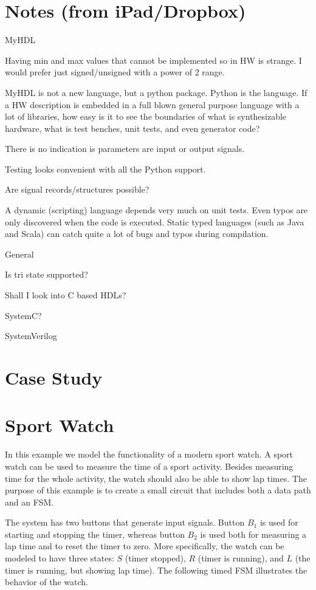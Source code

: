 \documentclass[10pt, technote, draftcls, onecolumn]{IEEEtran}
\begin{document}
\section{Notes (from iPad/Dropbox)}

MyHDL

Having min and max values that cannot be implemented so in HW is strange. I would prefer just signed/unsigned with a power of 2 range.

MyHDL is not a new language, but a python package. Python is the language. If a HW description is embedded in a full blown general purpose language with a lot of libraries, how easy is it to see the boundaries of what is synthesizable hardware, what is test benches, unit tests, and even generator code?

There is no indication is parameters are input or output signals.

Testing looks convenient with all the Python support.

Are signal records/structures possible?

A dynamic (scripting) language depends very much on unit tests. Even typos are only
discovered when the code is executed. Static typed languages (such as Java
and Scala) can catch quite a lot of bugs and typos during compilation.

General

Is tri state supported?

Shall I look into C based HDLs?

SystemC?

SystemVerilog

\section{Case Study}

\section{Sport Watch}
In this example we model the functionality of a modern sport
watch. A sport watch can be used to 
measure the time of a sport activity. Besides measuring time for the
whole activity, the watch should also be able to show lap times. The
purpose of this example is to create a small circuit that includes both
a data path and an FSM.

The system has two buttons that generate input signals. Button $B_1$
is used for starting and stopping the timer, whereas button $B_2$ is
used both for measuring a lap time and to reset the timer to zero. More
specifically, the watch can be modeled to have three states: $S$
(timer stopped), $R$ (timer is running), and $L$ (the timer is
running, but showing lap time). The following timed FSM illustrates
the behavior of the watch.\\
\end{document}
